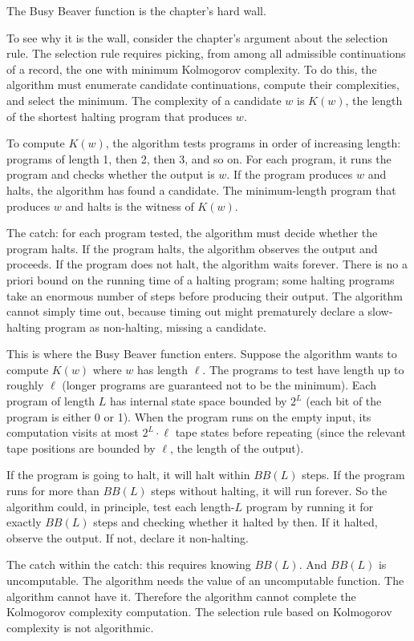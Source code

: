 The Busy Beaver function is the chapter's hard wall.

To see why it is the wall, consider the chapter's argument about the
selection rule. The selection rule requires picking, from among all
admissible continuations of a record, the one with minimum Kolmogorov
complexity. To do this, the algorithm must enumerate candidate
continuations, compute their complexities, and select the minimum.
The complexity of a candidate $w$ is $K(w)$, the length of the
shortest halting program that produces $w$.

To compute $K(w)$, the algorithm tests programs in order of
increasing length: programs of length 1, then 2, then 3, and so on.
For each program, it runs the program and checks whether the output
is $w$. If the program produces $w$ and halts, the algorithm has
found a candidate. The minimum-length program that produces $w$ and
halts is the witness of $K(w)$.

The catch: for each program tested, the algorithm must decide
whether the program halts. If the program halts, the algorithm
observes the output and proceeds. If the program does not halt, the
algorithm waits forever. There is no a priori bound on the running
time of a halting program; some halting programs take an enormous
number of steps before producing their output. The algorithm cannot
simply time out, because timing out might prematurely declare a
slow-halting program as non-halting, missing a candidate.

This is where the Busy Beaver function enters. Suppose the algorithm
wants to compute $K(w)$ where $w$ has length $\ell$. The programs to
test have length up to roughly $\ell$ (longer programs are
guaranteed not to be the minimum). Each program of length $L$ has
internal state space bounded by $2^L$ (each bit of the program is
either 0 or 1). When the program runs on the empty input, its
computation visits at most $2^L \cdot \ell$ tape states before
repeating (since the relevant tape positions are bounded by $\ell$,
the length of the output).

If the program is going to halt, it will halt within $BB(L)$ steps.
If the program runs for more than $BB(L)$ steps without halting, it
will run forever. So the algorithm could, in principle, test each
length-$L$ program by running it for exactly $BB(L)$ steps and
checking whether it halted by then. If it halted, observe the
output. If not, declare it non-halting.

The catch within the catch: this requires knowing $BB(L)$. And
$BB(L)$ is uncomputable. The algorithm needs the value of an
uncomputable function. The algorithm cannot have it. Therefore the
algorithm cannot complete the Kolmogorov complexity computation. The
selection rule based on Kolmogorov complexity is not algorithmic.

